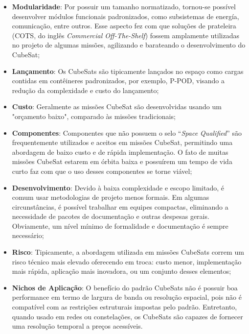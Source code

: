 \begin{itemize}

	\item \textbf{Modularidade}: Por possuir um tamanho normatizado, tornou-se possível desenvolver módulos funcionais padronizados, como subsistemas de energía, comunicação, entre outros. Esse aspecto fez com que soluções de prateleira (COTS, do inglês \textit{Commercial Off-The-Shelf}) fossem amplamente utilizadas no projeto de algumas missões, agilizando e barateando o desenvolvimento do CubeSat;

	\item \textbf{Lançamento}: Os CubeSats são tipicamente lançados no espaço como cargas contidas em contêineres padronizados, por exemplo, P-POD, visando a redução da complexidade e custo do lançamento;
	\item \textbf{Custo}: Geralmente as missões CubeSat são desenvolvidas usando um "orçamento baixo", comparado às missões tradicionais;
    \item \textbf{Componentes}: Componentes que não possuem o selo “\textit{Space Qualified}” são frequentemente utilizados e aceitos em missões CubeSat, permitindo uma abordagem de baixo custo e de rápida implementação. O fato de muitas missões CubeSat estarem em órbita baixa e possuírem um tempo de vida curto faz com que o uso desses componentes se torne viável;
    \item \textbf{Desenvolvimento}: Devido à baixa complexidade e escopo limitado, é comum usar metodologias de projeto menos formais. Em algumas circunstâncias, é possível trabalhar em equipes compactas, eliminando a necessidade de pacotes de documentação e outras despesas gerais. Obviamente, um nível mínimo de formalidade e documentação é sempre necessário;
    \item \textbf{Risco}: Tipicamente, a abordagem utilizada em missões CubeSats correm um risco técnico mais elevado oferecendo em troca: custo menor, implementação mais rápida, aplicação mais inovadora, ou um conjunto desses elementos;
    \item \textbf{Nichos de Aplicação}: O benefício do padrão CubeSats não é possuir boa performance em termo de largura de banda ou resolução espacial, pois não é compatível com as restrições estruturais impostas pelo padrão. Entretanto, quando usado em redes ou constelações, os CubeSats são capazes de fornecer uma resolução temporal a preços acessíveis.

\end{itemize}

